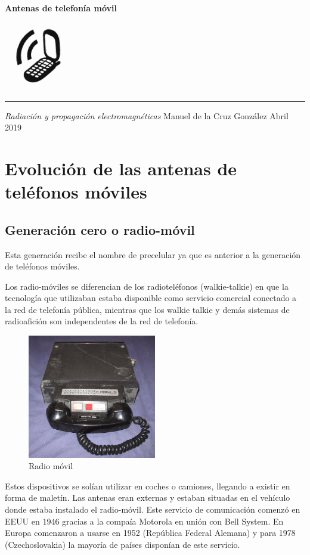 \documentclass[a4paper,11pt,titlepage]{article}
\begin{document}
\begin{titlepage}
  \vspace*{4cm}
  {\fontsize{28}{34}\selectfont\bfseries Antenas de telefonía móvil}
  \par
  \vspace{0.5cm}
  \centering
  \includegraphics[height=3cm]{movilportada} \\
  \vspace{0.5cm}
  {\color{gris}\hrule}
  \Large{\itshape Radiación y propagación electromagnéticas}
  \vfill
  {\large Manuel de la Cruz González \hfill Abril 2019}
\end{titlepage}
\tableofcontents
\newpage
\section{Evolución de las antenas de teléfonos móviles}
\subsection{Generación cero o radio-móvil}
Esta generación recibe el nombre de precelular ya que es anterior a la generación de teléfonos móviles. \par
Los radio-móviles se diferencian de los radioteléfonos (walkie-talkie) en que la tecnología que utilizaban estaba disponible como servicio comercial conectado a la red de telefonía pública, mientras que los walkie talkie y demás sistemas de radioafición son independentes de la red de telefonía.\par
\begin{figure}[H]
\centering
\includegraphics[width=0.5\textwidth]{cero}
\caption{Radio móvil}
\label{imagencero}
\end{figure}
Estos dispositivos se solían utilizar en coches o camiones, llegando a existir en forma de maletín. Las antenas eran externas y estaban situadas en el vehículo donde estaba instalado el radio-móvil.
Este servicio de comunicación comenzó en EEUU en 1946 gracias a la compaía Motorola en unión con Bell System. En Europa comenzaron a usarse en 1952 (República Federal Alemana) y para 1978 (Czechoslovakia) la mayoría de países disponían de este servicio.
\end{document}
